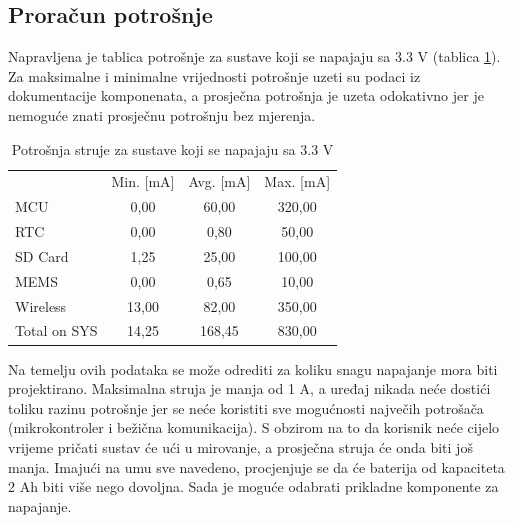 \subsection{Proračun potrošnje}
Napravljena je tablica potrošnje za sustave koji se napajaju sa 3.3 V (tablica \ref{tab:MB3V3}). Za maksimalne i minimalne vrijednosti potrošnje uzeti su podaci iz dokumentacije komponenata, a prosječna potrošnja je uzeta odokativno jer je nemoguće znati prosječnu potrošnju bez mjerenja.
\begin{table}[htbp]
    \centering
    \caption{Potrošnja struje za sustave koji se napajaju sa 3.3 V}
    \begin{tabular}{lccc} \hline
           & Min. [mA] & Avg. [mA] & Max. [mA] \\
      MCU  & 0,00 & 60,00 & 320,00 \\
      RTC  & 0,00 & 0,80 & 50,00 \\
      SD Card & 1,25 & 25,00 & 100,00 \\
      MEMS & 0,00 & 0,65 & 10,00 \\
      Wireless & 13,00 & 82,00 & 350,00 \\ \hline
      Total on SYS & 14,25 & 168,45 & 830,00 \\ \hline
    \end{tabular}%
    \label{tab:MB3V3}%
\end{table}%
Na temelju ovih podataka se može odrediti za koliku snagu napajanje mora biti projektirano. Maksimalna struja je manja od 1 A, a uređaj nikada neće dostići toliku razinu potrošnje jer se neće koristiti sve mogućnosti največih potrošača (mikrokontroler i bežična komunikacija). S obzirom na to da korisnik neće cijelo vrijeme pričati sustav će ući u mirovanje, a prosječna struja će onda biti još manja. Imajući na umu sve navedeno, procjenjuje se da će baterija od kapaciteta 2 Ah biti više nego dovoljna. Sada je moguće odabrati prikladne komponente za napajanje.

